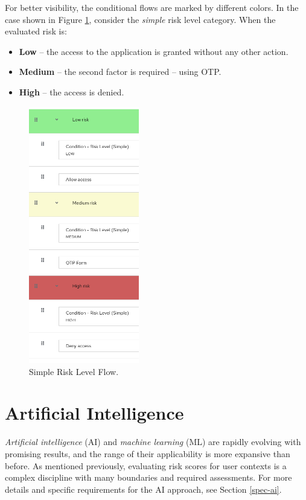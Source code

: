 For better visibility, the conditional flows are marked by different colors.
In the case shown in Figure \ref{fig:risk-levels-example}, consider the \textit{simple} risk level category. When the evaluated risk is:
\begin{itemize}
    \item \textbf{Low} -- the access to the application is granted without any other action.
    \item \textbf{Medium} -- the second factor is required -- using OTP.
    \item \textbf{High} -- the access is denied.
\end{itemize}

\begin{figure}[htbp]
  \centering
  \includegraphics[width=0.43\textwidth]{img/sections/5-design/simple-risk-level-flow.png}
  \caption{Simple Risk Level Flow.}
  \label{fig:risk-levels-example}
\end{figure}


\newpage
\section{Artificial Intelligence} \label{design-ai}
\textit{Artificial intelligence} (AI) and \textit{machine learning} (ML) are rapidly evolving with promising results, and the range of their applicability is more expansive than before.
As mentioned previously, evaluating risk scores for user contexts is a complex discipline with many boundaries and required assessments.
For more details and specific requirements for the AI approach, see Section \ref{spec-ai}.

